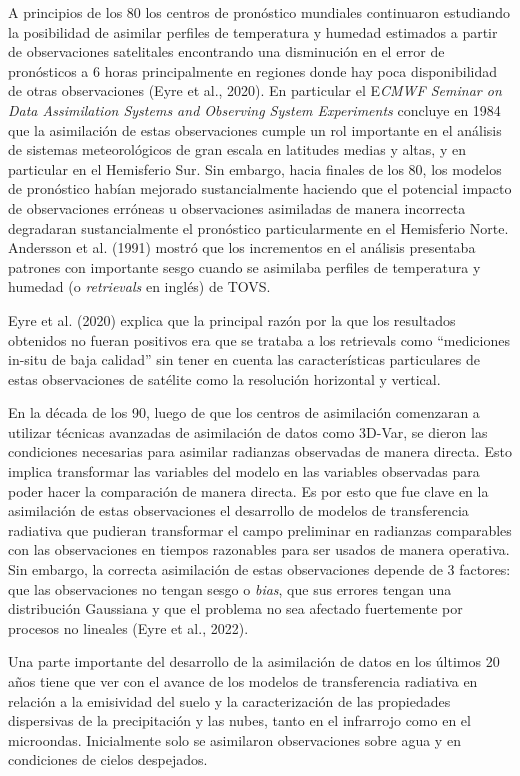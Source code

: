 \documentclass[12pt,oneside,a4paper]{reedthesis}
\begin{document}
A principios de los 80 los centros de pronóstico mundiales continuaron estudiando la posibilidad de asimilar perfiles de temperatura y humedad estimados a partir de observaciones satelitales encontrando una disminución en el error de pronósticos a 6 horas principalmente en regiones donde hay poca disponibilidad de otras observaciones (Eyre et al., 2020). En particular el E\emph{CMWF Seminar on Data Assimilation Systems and Observing System Experiments} concluye en 1984 que la asimilación de estas observaciones cumple un rol importante en el análisis de sistemas meteorológicos de gran escala en latitudes medias y altas, y en particular en el Hemisferio Sur. Sin embargo, hacia finales de los 80, los modelos de pronóstico habían mejorado sustancialmente haciendo que el potencial impacto de observaciones erróneas u observaciones asimiladas de manera incorrecta degradaran sustancialmente el pronóstico particularmente en el Hemisferio Norte. Andersson et al. (1991) mostró que los incrementos en el análisis presentaba patrones con importante sesgo cuando se asimilaba perfiles de temperatura y humedad (o \emph{retrievals} en inglés) de TOVS.

Eyre et al. (2020) explica que la principal razón por la que los resultados obtenidos no fueran positivos era que se trataba a los retrievals como ``mediciones in-situ de baja calidad'' sin tener en cuenta las características particulares de estas observaciones de satélite como la resolución horizontal y vertical.

En la década de los 90, luego de que los centros de asimilación comenzaran a utilizar técnicas avanzadas de asimilación de datos como 3D-Var, se dieron las condiciones necesarias para asimilar radianzas observadas de manera directa. Esto implica transformar las variables del modelo en las variables observadas para poder hacer la comparación de manera directa. Es por esto que fue clave en la asimilación de estas observaciones el desarrollo de modelos de transferencia radiativa que pudieran transformar el campo preliminar en radianzas comparables con las observaciones en tiempos razonables para ser usados de manera operativa. Sin embargo, la correcta asimilación de estas observaciones depende de 3 factores: que las observaciones no tengan sesgo o \emph{bias}, que sus errores tengan una distribución Gaussiana y que el problema no sea afectado fuertemente por procesos no lineales (Eyre et al., 2022).

Una parte importante del desarrollo de la asimilación de datos en los últimos 20 años tiene que ver con el avance de los modelos de transferencia radiativa en relación a la emisividad del suelo y la caracterización de las propiedades dispersivas de la precipitación y las nubes, tanto en el infrarrojo como en el microondas. Inicialmente solo se asimilaron observaciones sobre agua y en condiciones de cielos despejados.
\end{document}
